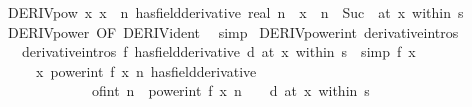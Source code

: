 \begin{isabellebody}
\endisatagproof
{\isafoldproof}%
%
\isadelimproof
\isanewline
%
\endisadelimproof
\isanewline
{}\isamarkupfalse%
\ DERIV{\isacharunderscore}{\kern0pt}pow{\isacharcolon}{\kern0pt}\ {\isachardoublequoteopen}{\isacharparenleft}{\kern0pt}{\isacharparenleft}{\kern0pt}{\isasymlambda}x{\isachardot}{\kern0pt}\ x\ {\isacharcircum}{\kern0pt}\ n{\isacharparenright}{\kern0pt}\ has{\isacharunderscore}{\kern0pt}field{\isacharunderscore}{\kern0pt}derivative\ real\ n\ {\isacharasterisk}{\kern0pt}\ {\isacharparenleft}{\kern0pt}x\ {\isacharcircum}{\kern0pt}\ {\isacharparenleft}{\kern0pt}n\ {\isacharminus}{\kern0pt}\ Suc\ {}{\isacharparenright}{\kern0pt}{\isacharparenright}{\kern0pt}{\isacharparenright}{\kern0pt}\ {\isacharparenleft}{\kern0pt}at\ x\ within\ s{\isacharparenright}{\kern0pt}{\isachardoublequoteclose}\isanewline
%
\isadelimproof
\ \ %
\endisadelimproof
%
\isatagproof
{}\isamarkupfalse%
\ DERIV{\isacharunderscore}{\kern0pt}power\ {\isacharbrackleft}{\kern0pt}OF\ DERIV{\isacharunderscore}{\kern0pt}ident{\isacharbrackright}{\kern0pt}\ \isamarkupfalse%
\ simp%
\endisatagproof
{\isafoldproof}%
%
\isadelimproof
\isanewline
%
\endisadelimproof
\isanewline
{}\isamarkupfalse%
\ DERIV{\isacharunderscore}{\kern0pt}power{\isacharunderscore}{\kern0pt}int\ {\isacharbrackleft}{\kern0pt}derivative{\isacharunderscore}{\kern0pt}intros{\isacharbrackright}{\kern0pt}{\isacharcolon}{\kern0pt}\isanewline
\ \ \ {\isacharbrackleft}{\kern0pt}derivative{\isacharunderscore}{\kern0pt}intros{\isacharbrackright}{\kern0pt}{\isacharcolon}{\kern0pt}\ {\isachardoublequoteopen}{\isacharparenleft}{\kern0pt}f\ has{\isacharunderscore}{\kern0pt}field{\isacharunderscore}{\kern0pt}derivative\ d{\isacharparenright}{\kern0pt}\ {\isacharparenleft}{\kern0pt}at\ x\ within\ s{\isacharparenright}{\kern0pt}{\isachardoublequoteclose}\ \ {\isacharbrackleft}{\kern0pt}simp{\isacharbrackright}{\kern0pt}{\isacharcolon}{\kern0pt}\ {\isachardoublequoteopen}f\ x\ {\isasymnoteq}\ {}{\isachardoublequoteclose}\isanewline
\ \ \ \ \ {\isachardoublequoteopen}{\isacharparenleft}{\kern0pt}{\isacharparenleft}{\kern0pt}{\isasymlambda}x{\isachardot}{\kern0pt}\ power{\isacharunderscore}{\kern0pt}int\ {\isacharparenleft}{\kern0pt}f\ x{\isacharparenright}{\kern0pt}\ n{\isacharparenright}{\kern0pt}\ has{\isacharunderscore}{\kern0pt}field{\isacharunderscore}{\kern0pt}derivative\isanewline
\ \ \ \ \ \ \ \ \ \ \ \ \ {\isacharparenleft}{\kern0pt}of{\isacharunderscore}{\kern0pt}int\ n\ {\isacharasterisk}{\kern0pt}\ power{\isacharunderscore}{\kern0pt}int\ {\isacharparenleft}{\kern0pt}f\ x{\isacharparenright}{\kern0pt}\ {\isacharparenleft}{\kern0pt}n\ {\isacharminus}{\kern0pt}\ {}{\isacharparenright}{\kern0pt}\ {\isacharasterisk}{\kern0pt}\ d{\isacharparenright}{\kern0pt}{\isacharparenright}{\kern0pt}\ {\isacharparenleft}{\kern0pt}at\ x\ within\ s{\isacharparenright}{\kern0pt}{\isachardoublequoteclose}\isanewline

\end{isabellebody}
